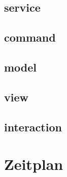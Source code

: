 \documentclass[18pt]{beamer}
\begin{document}
	\subsection{service}
		
	\subsection{command}
		
	\subsection{model}
		
		
	\subsection{view}
		
	\subsection{interaction}
		

\section{Zeitplan}

\appendix
\beginbackup
\backupend
\end{document}

